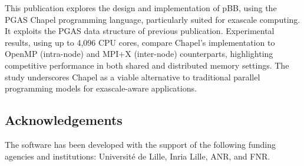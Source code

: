 This publication explores the design and implementation of pBB, using the PGAS Chapel programming language, particularly suited for exascale computing. It exploits the PGAS data structure of previous publication. Experimental results, using up to 4,096 CPU cores, compare Chapel's implementation to OpenMP (intra-node) and MPI+X (inter-node) counterparts, highlighting competitive performance in both shared and distributed memory settings. The study underscores Chapel as a viable alternative to traditional parallel programming models for exascale-aware applications.

\subsection{Acknowledgements}
\label{sec::pBB:acknowledgements}

The software has been developed with the support of the following funding agencies and institutions: Université de Lille, Inria Lille, ANR, and FNR.